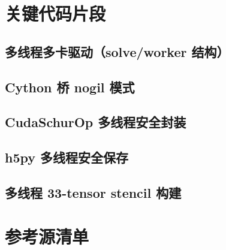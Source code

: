 \documentclass[UTF8]{ctexart}
\begin{document}
\section{关键代码片段}

\subsection{多线程多卡驱动（solve/worker 结构）}


\subsection{Cython 桥 nogil 模式}


\subsection{CudaSchurOp 多线程安全封装}


\subsection{h5py 多线程安全保存}


\subsection{多线程 33-tensor stencil 构建}


\section{参考源清单}
\end{document}
